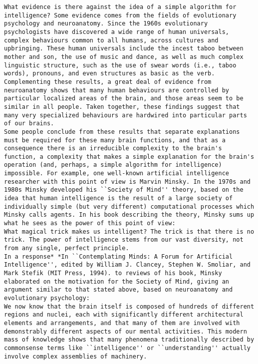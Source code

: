 \begin{lstlisting}
What evidence is there against the idea of a simple algorithm for intelligence? Some evidence comes from the fields of evolutionary psychology and neuroanatomy. Since the 1960s evolutionary psychologists have discovered a wide range of human universals, complex behaviours common to all humans, across cultures and upbringing. These human universals include the incest taboo between mother and son, the use of music and dance, as well as much complex linguistic structure, such as the use of swear words (i.e., taboo words), pronouns, and even structures as basic as the verb. Complementing these results, a great deal of evidence from neuroanatomy shows that many human behaviours are controlled by particular localized areas of the brain, and those areas seem to be similar in all people. Taken together, these findings suggest that many very specialized behaviours are hardwired into particular parts of our brains.
Some people conclude from these results that separate explanations must be required for these many brain functions, and that as a consequence there is an irreducible complexity to the brain's function, a complexity that makes a simple explanation for the brain's operation (and, perhaps, a simple algorithm for intelligence) impossible. For example, one well-known artificial intelligence researcher with this point of view is Marvin Minsky. In the 1970s and 1980s Minsky developed his ``Society of Mind'' theory, based on the idea that human intelligence is the result of a large society of individually simple (but very different) computational processes which Minsky calls agents. In his book describing the theory, Minsky sums up what he sees as the power of this point of view: 
What magical trick makes us intelligent? The trick is that there is no trick. The power of intelligence stems from our vast diversity, not from any single, perfect principle. 
In a response* *In ``Contemplating Minds: A Forum for Artificial Intelligence'', edited by William J. Clancey, Stephen W. Smoliar, and Mark Stefik (MIT Press, 1994). to reviews of his book, Minsky elaborated on the motivation for the Society of Mind, giving an argument similar to that stated above, based on neuroanatomy and evolutionary psychology: 
We now know that the brain itself is composed of hundreds of different regions and nuclei, each with significantly different architectural elements and arrangements, and that many of them are involved with demonstrably different aspects of our mental activities. This modern mass of knowledge shows that many phenomena traditionally described by commonsense terms like ``intelligence'' or ``understanding'' actually involve complex assemblies of machinery. 

\end{lstlisting}
